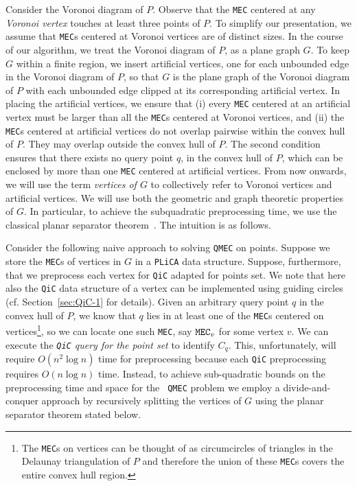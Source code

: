 \documentclass[12pt]{llncs}
\begin{document}
Consider the Voronoi diagram of $P$. Observe that the {\tt MEC} centered at 
any {\it Voronoi vertex} touches at least three points of $P$. To simplify 
our presentation, we assume  that {\tt MEC}s 
centered at Voronoi vertices are of distinct sizes. 
In the course of our algorithm, we  treat the Voronoi diagram of $P$, as a 
plane graph  $G$. To keep $G$ within a finite region, we  insert artificial vertices,
one for each unbounded edge in the Voronoi diagram 
of $P$,  so that $G$ is the plane graph of the Voronoi diagram of $P$ with each 
unbounded edge clipped at 
its corresponding artificial vertex. In placing the artificial vertices, we ensure that 
(i) every {\tt MEC} centered at an artificial vertex 
must be larger than all the {\tt MEC}s centered at Voronoi vertices, and 
(ii) 
the {\tt MEC}s centered at artificial vertices do not overlap pairwise within 
the convex hull of $P$. They may overlap outside the convex hull of $P$.
The second condition ensures that there exists no query point $q$, in the convex hull 
of $P
$,
which can be enclosed by more than one {\tt MEC} centered at artificial vertices.
From now onwards, we will use the term {\em vertices of $G$} to collectively refer 
to Voronoi vertices and artificial vertices. We will use both the geometric and 
graph theoretic properties of $G$. In particular, to achieve the subquadratic 
preprocessing time, we use the classical planar separator theorem\ \cite{LT79}. The intuition is as follows.


Consider the following naive approach to solving {\tt QMEC} on points.
Suppose we store the {\tt MEC}s of vertices in $G$ in a {\tt PLiCA} data structure. Suppose, furthermore, that we preprocess each vertex for {\tt QiC} adapted for points set. We note that
here also the {\tt QiC} data structure of a vertex can be implemented using 
guiding circles (cf. Section\ \ref{sec:QiC-1} for details).
Given an arbitrary query point $q$ in 
the convex hull of $P$, we know that $q$ lies in at least one of the {\tt MEC}s centered on vertices\footnote{The {\tt MEC}s on vertices can be thought of as circumcircles of triangles in the Delaunay triangulation of $P$ and therefore the union of these {\tt MEC}s covers the entire convex hull region.}, 
so we can locate one such {\tt MEC}, say ${\tt MEC}_v$ for some vertex $v$. We can
execute the {\it {\tt QiC} query for the point set} to identify $C_q$.  This, unfortunately, will require $O(n^2 \log n)$ time for preprocessing because each {\tt QiC} preprocessing requires $O(n \log n)$ time. Instead, to achieve sub-quadratic bounds on the preprocessing time and space for the {\tt 
QMEC} problem we employ a divide-and-conquer approach
by recursively splitting the vertices of $G$ using the planar separator theorem 
 stated below.
\end{document}
